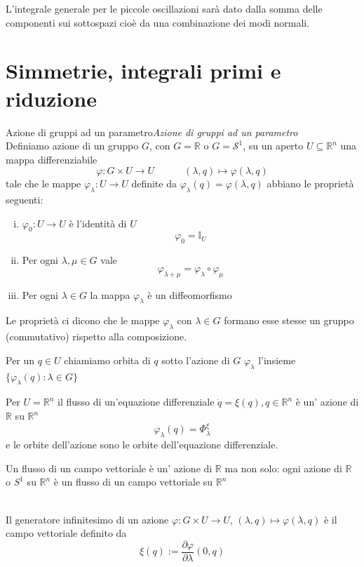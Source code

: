 \documentclass[11pt,a4paper,twoside]{book}
\newenvironment{definizione}[1][\empty]{\begin{Definizione}{
\ifx\empty#1\relax\else\mdseries\itshape#1\\\fi
}{}}{\end{Definizione}}
\newenvironment{esempio}[1][Esempio]{ 
  \begin{center}\begin{tcolorbox}[
  title={#1:\\},
  width=0.9\linewidth,
  flush right,
  enhanced jigsaw, 
  colback=white, 
  frame hidden, 
  sharpish corners, arc=3mm,
  borderline west = {1pt}{0pt}{gray},
  borderline south = {1pt}{0pt}{gray},
  coltitle=black, 
  fonttitle=\small\bfseries, 
  attach title to upper, 
  breakable,
  top=2.5pt, bottom=0.3pt]\small
  }{
 \normalsize \end{tcolorbox}\end{center}
}
\theoremstyle{esss}
\theoremstyle{dotless}
\numberwithin{equation}{section} %
\begin{document}
L'integrale generale per le piccole oscillazioni sarà dato dalla somma delle componenti sui sottospazi cioè da una combinazione dei modi normali.


\section{Simmetrie, integrali primi e riduzione}

\begin{definizione}[Azione di gruppi ad un parametro]
Definiamo azione di un gruppo $G$, con $G=\mathbb{R}$ o $G=\mathcal{S}^1$, su un aperto $U\subseteq \mathbb{R}^n$ una mappa differenziabile 
\[
\varphi: G\times U \rightarrow U \quad \qquad
(\lambda,q)\mapsto \varphi (\lambda,q)
\]
tale che le mappe $\varphi_\lambda :U\rightarrow U$ definite da $\varphi_\lambda(q)=\varphi(\lambda,q)$ abbiano le proprietà seguenti:\begin{enumerate}[i.]
\item $\varphi_0:U\rightarrow U$ è l'identità di $U$ 
\[\varphi_0=\mathbb{I}_U\]
\item Per ogni $\lambda, \mu\in G$ vale
\[
\varphi_{\lambda+\mu}=\varphi_\lambda\circ\varphi_\mu
\]
\item Per ogni $\lambda\in G$ la mappa $\varphi_\lambda$ è un diffeomorfismo
\end{enumerate}
\end{definizione}

Le proprietà ci dicono che le mappe $\varphi_\lambda$ con $\lambda\in G$ formano esse stesse un gruppo (commutativo) rispetto alla composizione.

Per un $q\in U$ chiamiamo orbita di $q$ sotto l'azione di $G$ $\varphi_\lambda$ l'insieme $\{\varphi_\lambda(q) : \lambda\in G\}$

\begin{esempio}[Flusso]
Per $U=\mathbb{R}^n$ il flusso di un'equazione differenziale $\dot{q}=\xi(q), q\in\mathbb{R}^n$ è un' azione di $\mathbb{R}$ su $\mathbb{R}^n$
\[
\varphi_\lambda(q)=\Phi_\lambda^\xi
\]
e le orbite dell'azione sono le orbite dell'equazione differenziale.
\end{esempio}


Un flusso di un campo vettoriale è un' azione di $\mathbb{R}$ ma non solo: ogni azione di $\mathbb{R}$ o $S^1$ su $\mathbb{R}^n$ è un flusso di un campo vettoriale su $\mathbb{R}^n$

\begin{definizione}
Il generatore infinitesimo di un azione $\varphi:G\times U\rightarrow U$, $(\lambda,q)\mapsto\varphi(\lambda,q)$ è il campo vettoriale definito da
\begin{equation}
\xi(q):=\dfrac{\partial\varphi}{\partial \lambda} (0,q)
\end{equation}
\end{definizione}
\end{document}
